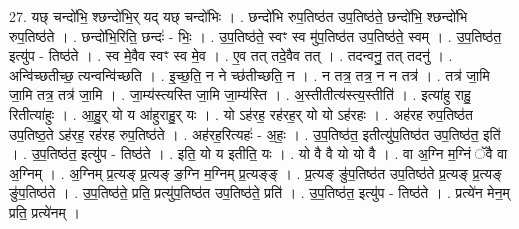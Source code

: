 \documentclass[17pt]{extarticle}
\begin{document}
27. यछ् चन्दो॑भि॒ श्छन्दो॑भि॒र् यद् यछ्‌ चन्दो॑भिः । . छन्दो॑भि रुप॒तिष्ठ॑त उप॒तिष्ठ॑ते॒ छन्दो॑भि॒ श्छन्दो॑भि रुप॒तिष्ठ॑ते । . छन्दो॑भि॒रिति॒ छन्दः॑ - भिः॒ । . उ॒प॒तिष्ठ॑ते॒ स्वꣳ स्व मु॑प॒तिष्ठ॑त उप॒तिष्ठ॑ते॒ स्वम् । . उ॒प॒तिष्ठ॑त॒ इत्यु॑प - तिष्ठ॑ते । . स्व मे॒वैव स्वꣳ स्व मे॒व । . ए॒व तत् तदे॒वैव तत् । . तदन्वनु॒ तत् तदनु॑ । . अन्वि॑च्छतीच्छ॒ त्यन्वन्वि॑च्छति । . इ॒च्छ॒ति॒ न ने च्छ॑तीच्छति॒ न । . न तत्र॒ तत्र॒ न न तत्र॑ । . तत्र॑ जा॒मि जा॒मि तत्र॒ तत्र॑ जा॒मि । . जा॒म्य॑स्त्यस्ति जा॒मि जा॒म्य॑स्ति । . अ॒स्तीतीत्य॑स्त्य॒स्तीति॑ । . इत्या॑हु राहु॒ रितीत्या॑हुः । . आ॒हु॒र् यो य आ॑हुराहु॒र् यः । . यो ऽह॑रह॒ रह॑रह॒र् यो यो ऽह॑रहः । . अह॑रह रुप॒तिष्ठ॑त उप॒तिष्ठ॒ते ऽह॑रह॒ रह॑रह रुप॒तिष्ठ॑ते । . अह॑रह॒रित्यहः॑ - अ॒हः॒ । . उ॒प॒तिष्ठ॑त॒ इतीत्यु॑प॒तिष्ठ॑त उप॒तिष्ठ॑त॒ इति॑ । . उ॒प॒तिष्ठ॑त॒ इत्यु॑प - तिष्ठ॑ते । . इति॒ यो य इतीति॒ यः । . यो वै वै यो यो वै । . वा अ॒ग्नि म॒ग्निं ॅवै वा अ॒ग्निम् । . अ॒ग्निम् प्र॒त्यङ् प्र॒त्यङ् ङ॒ग्नि म॒ग्निम् प्र॒त्यङ्ङ् । . प्र॒त्यङ् ङु॑प॒तिष्ठ॑त उप॒तिष्ठ॑ते प्र॒त्यङ् प्र॒त्यङ् ङु॑प॒तिष्ठ॑ते । . उ॒प॒तिष्ठ॑ते॒ प्रति॒ प्रत्यु॑प॒तिष्ठ॑त उप॒तिष्ठ॑ते॒ प्रति॑ । . उ॒प॒तिष्ठ॑त॒ इत्यु॑प - तिष्ठ॑ते । . प्रत्ये॑न मेन॒म् प्रति॒ प्रत्ये॑नम् । \newline
\end{document}
